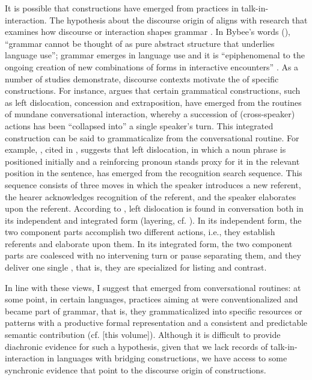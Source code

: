 \documentclass[output=paper]{LSP/langsci}
\begin{document}
It is possible that  constructions have emerged from  practices in talk-in-interaction. The hypothesis about the discourse origin of  aligns with research that examines how discourse or interaction shapes grammar \citep{givon79,hopper80,ochs96,Selting01}. In Bybee’s words (\citeyear[][730]{bybee.2006}), ``grammar cannot be thought of as pure abstract structure that underlies language use''; grammar emerges in language use and it is ``epiphenomenal to the ongoing creation of new combinations of forms in interactive encounters'' \citep[][26]{hopper11}. As a number of studies \citep{couper11,gipper11,blythe.2013} demonstrate, discourse contexts motivate the  of specific constructions. For instance, \citet{couper11} argues that certain grammatical constructions, such as left dislocation, concession and extraposition, have emerged from the  routines of mundane conversational interaction, whereby a succession of (cross-speaker) actions has been ``collapsed into'' a single speaker’s turn. This integrated construction can be said to grammaticalize from the conversational routine. For example, \citet{geluykens92}, cited in \citet{couper11}, suggests that left dislocation, in which a noun phrase is positioned initially and a reinforcing pronoun stands proxy for it in the relevant position in the sentence, has emerged from the recognition search sequence. This sequence consists of three moves in which the speaker introduces a new referent, the hearer acknowledges recognition of the referent, and the speaker elaborates upon the referent. According to \citet[][429]{couper11}, left dislocation is found in  conversation both in its independent and integrated form (layering, cf. \citealt{hopper91}). In its independent form, the two component parts accomplish two different actions, i.e., they establish referents and elaborate upon them. In its integrated form, the two component parts are coalesced with no intervening turn or pause separating them, and they deliver one single , that is, they are specialized for listing and contrast. 

In line with these views, I suggest that  emerged from conversational routines: at some point, in certain languages,  practices aiming at  were conventionalized and became part of grammar, that is, they grammaticalized into specific resources or patterns with a productive formal representation and a consistent and predictable semantic contribution (cf. \citealt{chapters/01Guerin-Aiton} [this volume]). Although it is difficult to provide diachronic evidence for such a hypothesis, given that we lack records of talk-in-interaction in languages with bridging constructions, we have access to some synchronic evidence that point to the discourse origin of  constructions. 
\end{document}
